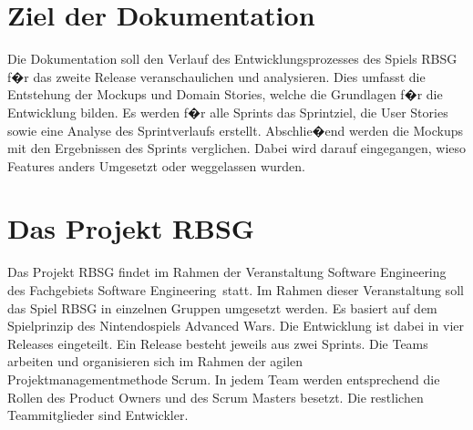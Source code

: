 \documentclass[12pt, titlepage]{scrartcl}
\newcommand{\RN}[1]{%
	\textup{\uppercase\expandafter{\romannumeral#1}}%
}
\begin{document}
	\section{Ziel der Dokumentation}
		Die Dokumentation soll den Verlauf des Entwicklungsprozesses des Spiels RBSG f�r das zweite Release veranschaulichen und analysieren. Dies umfasst die Entstehung der Mockups und Domain Stories, welche die Grundlagen f�r die Entwicklung bilden. Es werden f�r alle Sprints das Sprintziel, die User Stories sowie eine Analyse des Sprintverlaufs erstellt. Abschlie�end werden die Mockups mit den Ergebnissen des Sprints verglichen. Dabei wird darauf eingegangen, wieso Features anders Umgesetzt oder weggelassen wurden.
	\section{Das Projekt RBSG}
			Das Projekt RBSG findet im Rahmen der Veranstaltung Software Engineering \RN{1} des Fachgebiets Software Engineering\ statt. Im Rahmen dieser Veranstaltung soll das Spiel RBSG in einzelnen Gruppen umgesetzt werden. Es basiert auf dem Spielprinzip des Nintendospiels Advanced Wars. Die Entwicklung ist dabei in vier Releases eingeteilt. Ein Release besteht jeweils aus zwei Sprints. Die Teams arbeiten und organisieren sich im Rahmen der agilen Projektmanagementmethode Scrum. In jedem Team werden entsprechend die Rollen des Product Owners und des Scrum Masters besetzt. Die restlichen Teammitglieder sind Entwickler.
		
\end{document}

